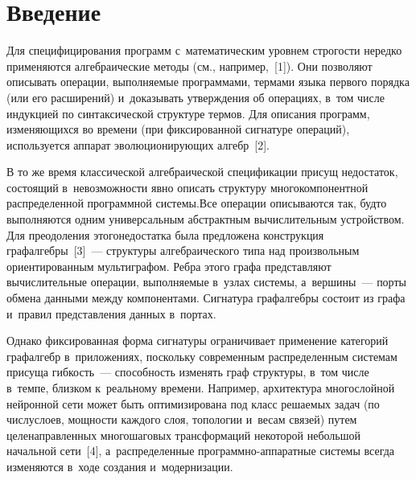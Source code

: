 


\thispagestyle{headings}

\begin{multicols}{2}

\label{st\stat}

\section{Введение}

     Для специфицирования программ с~математическим уровнем строгости 
нередко применяются алгебраические методы (см., например,~[1]). Они 
позволяют описывать операции, вы\-пол\-ня\-емые программами, термами языка 
первого порядка (или его расширений) и~доказывать утверждения об 
операциях, в~том числе индукцией по синтаксической структуре термов. Для 
описания программ, изменяющихся во времени (при фиксированной сигнатуре 
операций), используется аппарат эво\-лю\-ци\-о\-ни\-ру\-ющих алгебр~[2].
    
     В то же время классической алгебраической спецификации присущ 
недостаток, состоящий в~невозможности явно описать структуру 
многокомпонентной распределенной программной сис\-те\-мы.\linebreak Все операции 
описываются так, будто выполняются одним универсальным абстрактным 
вы\-чис\-ли\-тель\-ным устройством. Для преодоления этого\linebreak недостатка была 
предложена конструкция граф\-ал\-геб\-ры~[3]~--- структуры алгебраического типа 
над произвольным ориентированным мультиграфом. Реб\-ра этого графа 
представляют вы\-чис\-ли\-тель\-ные операции, выполняемые в~узлах системы, 
а~вершины~--- порты обмена данными между компонентами. Сигнатура 
графалгебры со\-сто\-ит из графа и~правил пред\-став\-ле\-ния данных в~портах.
     
     Однако фиксированная форма сигнатуры ограничивает применение 
категорий графалгебр в~приложениях, поскольку современным распределенным 
сис\-те\-мам присуща гиб\-кость~--- спо\-соб\-ность изменять граф структуры, в~том 
числе в~темпе, близком к~реальному времени. Например, архитектура 
многослойной нейронной сети может быть оптимизирована под класс 
решаемых задач (по чис\-лу\linebreak слоев, мощ\-ности каждого слоя, топологии и~весам\linebreak 
связей) путем це\-ле\-на\-прав\-лен\-ных многошаговых трансформаций некоторой 
небольшой начальной сети~[4], а~распределенные  
про\-грам\-мно-ап\-па\-рат\-ные сис\-те\-мы всегда изменяются в~ходе создания и~модернизации.
     

\end{multicols}
